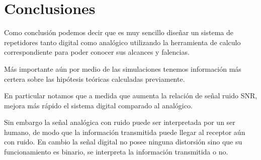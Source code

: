 \section{Conclusiones}
\label{sec:conclu}

Como conclusión podemos decir que es muy sencillo diseñar un sistema de repetidores tanto digital como analógico utilizando la herramienta de calculo correspondiente para poder conocer sus alcances y falencias.

Más importante aún por medio de las simulaciones tenemos información más certera sobre las hipótesis teóricas calculadas previamente.  

En particular notamos que a medida que aumenta la relación de señal ruido SNR, mejora más rápido el sistema digital comparado al analógico. 

Sin embargo la señal analógica con ruido puede ser interpretada por un ser humano, de modo que la información transmitida puede llegar al receptor aún con ruido.
En cambio la señal digital no posee ninguna distorsión sino que su funcionamiento es binario, se interpreta la información transmitida o no.